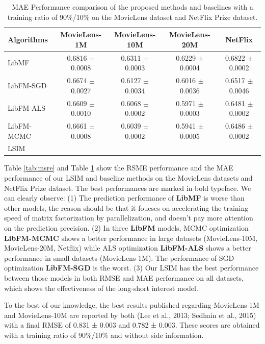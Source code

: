 \documentclass{sig-alternate-05-2015}
\begin{document}
\begin{table}[htpb]
	\centering
	\caption{MAE Performance comparison of the proposed methods and baselines with a training ratio of 90\%/10\%
    on the MovieLens dataset and NetFlix Prize dataset.}
	\label{tab:mae}
	\begin{tabular}{|l|c|c|c|c|}
		\hline
		\textbf{Algorithms} & \textbf{MovieLens-1M} & \textbf{MovieLens-10M} & \textbf{MovieLens-20M}  & \textbf{NetFlix} \\
		\hline
		LibMF      & 0.6816 $\pm$ 0.0008 & 0.6311 $\pm$ 0.0003 & 0.6229 $\pm$ 0.0004 & 0.6822 $\pm$ 0.0002 \\
		LibFM-SGD  & 0.6674 $\pm$ 0.0027 & 0.6127 $\pm$ 0.0034 & 0.6016 $\pm$ 0.0036 & 0.6517 $\pm$ 0.0046 \\
		LibFM-ALS  & 0.6609 $\pm$ 0.0010 & 0.6068 $\pm$ 0.0002 & 0.5971 $\pm$ 0.0003 & 0.6481 $\pm$ 0.0002 \\
        LibFM-MCMC & 0.6661 $\pm$ 0.0008 & 0.6039 $\pm$ 0.0002 & 0.5941 $\pm$ 0.0005 & 0.6486 $\pm$ 0.0002 \\
		LSIM       &  &  &  & \\
		\hline
	\end{tabular}
\end{table}

Table \ref{tab:msre} and Table \ref{tab:mae} show the RSME performance and the MAE performance
of our LSIM and baseline methods on the MovieLens datasets and NetFlix Prize dataset.
The best performances are marked in bold typeface.
We can clearly observe:
(1) The prediction performance of \textbf{LibMF} is worse than other models, the reason
should be that it foucses on accelerating the training speed of matrix factorization by
parallelization, and doesn't pay more attention on the prediction precision.
(2) In three \textbf{LibFM} models, MCMC optimization \textbf{LibFM-MCMC} shows
a better performance in large datasets (MovieLens-10M, MovieLens-20M, Netflix) while
ALS optimization \textbf{LibFM-ALS} shows a better performance in small datasets (MovieLens-1M).
The performance of SGD optimization \textbf{LibFM-SGD} is the worst.
(3) Our LSIM has the best performance between those models in both RMSE and MAE performance on all datasets,
which shows the effectiveness of the long-short interest model.

To the best of our knowledge, the best results published regarding MovieLens-1M and MovieLens-10M
are reported by both (Lee et al., 2013; Sedhain et al., 2015) with a final RMSE of 0.831 ± 0.003
and 0.782 ± 0.003. These scores are obtained with a training ratio of 90\%/10\% and without side information.
\end{document}
